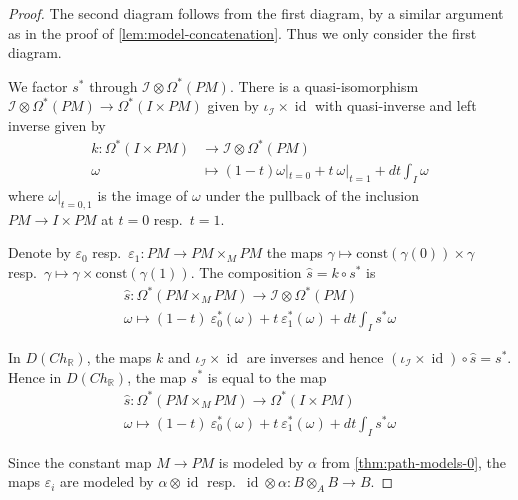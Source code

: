 \documentclass{scrartcl}
\theoremstyle{plain}
\theoremstyle{definition}
\newcommand{\R}{\mathbb R}
\renewcommand{\epsilon}{\varepsilon}
\DeclareMathOperator{\id}{id}
\newcommand{\comp}{\mathbin{\circ}}
\begin{document}
\begin{proof}
    The second diagram follows from the first diagram, by a similar argument as in the proof of \cref{lem:model-concatenation}. Thus we only consider the first diagram.

    We factor $s^*$ through $\mathcal I\otimes \Omega^*(PM)$. There is a quasi-isomorphism $\mathcal I\otimes\Omega^*(PM)\to \Omega^*(I\times PM)$ given by $\iota_{\mathcal I}\times\id$ with quasi-inverse and left inverse given by 
    \begin{align*}
        k\colon\Omega^*(I\times PM) &\to \mathcal I \otimes \Omega^*(PM) \\
        \omega & \mapsto (1-t)\omega|_{t=0} + t\ \omega|_{t=1} + dt \int_I \omega
    \end{align*}
    where $\omega|_{t=0,1}$ is the image of $\omega$ under the pullback of the inclusion $PM\to I\times PM$ at $t=0$ resp.\ $t=1$.

    Denote by $\epsilon_{0}$ resp.\ $\epsilon_1\colon PM\to PM\times_M PM$ the maps $\gamma\mapsto \mathrm{const}(\gamma(0))\times \gamma$ resp.\ $\gamma\mapsto \gamma\times \mathrm{const}(\gamma(1))$. The composition $\hat s = k\comp s^*$ is
    \begin{align*}
        \hat s\colon \Omega^*(PM\times_M PM)\to \mathcal I\otimes\Omega^*(PM)\\
        \omega \mapsto (1-t)\ \epsilon_0^*(\omega) + t\ \epsilon_1^*(\omega) + dt \int_I s^*\omega
    \end{align*}

    In $D(Ch_{\R})$, the maps $k$ and $\iota_{\mathcal I}\times \id$ are inverses and hence $(\iota_{\mathcal I}\times \id)\comp \hat s = s^*$. Hence in $D(Ch_{\R})$, the map $s^*$ is  equal to the map
    \begin{align*}
        \hat s\colon \Omega^*(PM\times_M PM)\to \Omega^*(I\times PM)\\
        \omega \mapsto (1-t)\ \epsilon_0^*(\omega) + t\ \epsilon_1^*(\omega) + dt \int_I s^*\omega
    \end{align*}

    Since the constant map $M\to PM$ is modeled by $\alpha$ from \cref{thm:path-models-0}, the maps $\epsilon_i$ are modeled by $\alpha\otimes\id$ resp.\ $\id\otimes\alpha\colon B\otimes_A B\to B$.
    

\end{proof}
\end{document}
